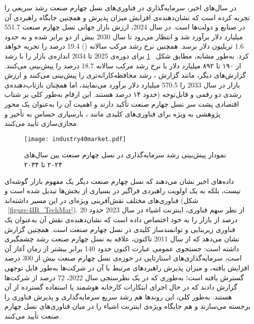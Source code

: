 در سال‌های اخیر، سرمایه‌گذاری در فناوری‌های نسل چهارم صنعت رشد سریعی را تجربه کرده است که نشان‌دهنده‌ی افزایش میزان پذیرش و همچنین جایگاه راهبردی آن در صنایع و دولت‌ها است. در سال 2024، ارزش بازار جهانی نسل چهارم صنعت 551.7 میلیارد دلار برآورد شد و انتظار می‌رود تا سال 2030 بیش از دو برابر شده و به حدود 1.6 تریلیون دلار برسد. همچنین نرخ رشد مرکب سالانه () 19.4 درصد را تجربه خواهد کرد\cite{RnM2025GlobMar}. به‌طور مشابه، مطابق شکل ~\ref{figure:4IR_Mar} برای دوره‌ی 2025 تا 2034 اندازه‌ی بازار را با رشد از ۱۹۰ تا ۸۹۲ میلیارد دلار با نرخ رشد مرکب سالانه 18.7 درصد را پیش‌بینی می‌کنند\cite{StatiFacts2025GlobMar}. گزارش‌های دیگر، مانند گزارش  \cite{IMARC2025GlobInd}، رشد محافظه‌کارانه‌تری را پیش‌بینی می‌کنند و ارزش بازار در سال 2033 را 570.5 میلیارد دلار برآورد می‌نمایند، اما همچنان بازتاب‌دهنده‌ی رشدی دو رقمی و قابل‌توجه  (حدود ۱۴ درصد  هستند. این ارقام به‌طور کلی بر شتاب اقتصادی پشت سر نسل چهارم صنعت تأکید دارند و اهمیت آن را به‌عنوان یک محور پژوهشی به ‌ویژه برای فناوری‌های کلیدی مانند ، بارسپاری حساس به تأخیر و مجازی‌سازی تأیید می‌کنند.

\vspace{0.5cm}
\begin{figure}[h]
\centering
\texttt{[image: industry40market.pdf]}
\caption{نمودار پیش‌بینی رشد سرمایه‌گذاری در نسل چهارم صنعت بین سال‌های ۲۰۲۴ تا ۲۰۳۴\cite{StatiFacts2025GlobMar}}
\label{figure:4IR_Mar}
\end{figure}
\vspace{0.5cm}

داده‌های اخیر نشان می‌دهند که نسل چهارم صنعت دیگر یک مفهوم بازار گوشه‌ای نیست، بلکه به یک اولویت راهبردی فراگیر در بسیاری از بخش‌ها تبدیل شده است و فناوری‌های مختلف نقش‌آفرینی ویژه‌ای در این مسیر داشته‌اند (شکل ~\ref{figure:4IR_TechMar}). از نظر سهم فناوری، اینترنت اشیاء  در سال 2023 حدود 20 درصد از بازار را به خود اختصاص داده است که نشان‌دهنده‌ی نقش آن به‌عنوان یک فناوری زیربنایی و توانمندساز کلیدی در نسل چهارم صنعت است\cite{GM2025Rise}. همچنین گزارش  نشان می‌دهد\cite{IoTAnal2025Rise} که از سال 2011 تاکنون، علاقه به نسل چهارم صنعت رشد چشمگیری داشته است: جستجوی عمومی عبارت  اکنون حدود 140 برابر بیشتر از زمان آغاز آن است، سرمایه‌گذاری‌های استارتاپی در حوزه‌ی نسل چهارم صنعت بیش از 300 درصد افزایش یافته، و میزان پذیرش راهبردهای مرتبط با آن در شرکت‌ها به‌طور قابل توجهی گسترش یافته است؛ به‌طوری که در یک نظرسنجی سال 2022، 72 درصد از شرکت‌ها گزارش دادند که در حال اجرای ابتکارات کارخانه هوشمند  یا استفاده گسترده از آن هستند. به‌طور کلی، این روندها هم رشد سریع سرمایه‌گذاری و پذیرش فناوری را برجسته می‌سازند و هم جایگاه ویژه‌ی اینترنت اشیاء را در میان فناوری‌های نسل چهارم صنعت تأیید می‌کنند.

